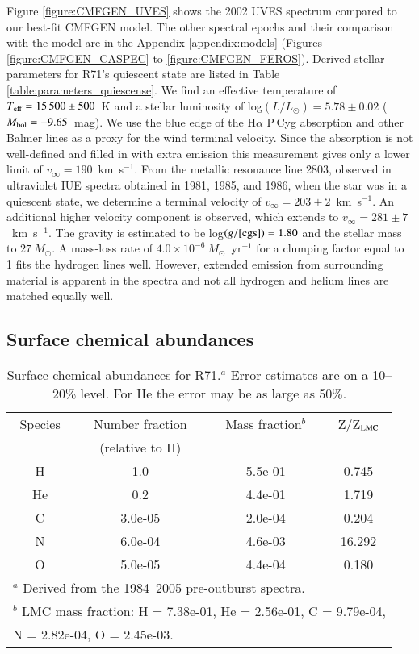 \documentclass[structabstract]{aa}
\begin{document}
Figure \ref{figure:CMFGEN_UVES} shows the 2002 UVES spectrum compared to our best-fit CMFGEN model. The other spectral epochs and their comparison with the model are in the Appendix \ref{appendix:models} (Figures \ref{figure:CMFGEN_CASPEC} to \ref{figure:CMFGEN_FEROS}).  Derived stellar parameters for R71's quiescent state are listed in Table \ref{table:parameters_quiescense}.
We find an effective temperature of $T_\textnormal{\scriptsize{eff}} = 15\,500 \pm 500$~K and a stellar luminosity of log$(L/L_{\odot}) = 5.78 \pm 0.02$ ($M_\textnormal{\scriptsize{bol}}  = -9.65$~mag).
We use the blue edge of the H$\alpha$ P\,Cyg absorption and other Balmer lines as a proxy for the wind terminal velocity. Since the absorption is not well-defined and filled in with extra emission this measurement gives only a lower limit of $v_\infty = 190$~km~s$^{-1}$. 
From the metallic resonance line  2803, observed in ultraviolet IUE spectra obtained in 1981, 1985, and 1986, when the star was in a quiescent state, we determine a terminal velocity of $v_\infty = 203 \pm2$~km~s$^{-1}$. An additional higher velocity component is observed, which extends to $v_\infty = 281 \pm7$~km~s$^{-1}$.
The gravity is estimated to be log$(g/\textnormal{[cgs]}) = 1.80$ and the stellar mass to $27~M_{\odot}$. A mass-loss rate of $4.0 \times 10^{-6}~M_{\odot}$~yr$^{-1}$ for a clumping factor equal to 1 fits the hydrogen lines well. However, extended emission from surrounding material is apparent in the spectra and not all hydrogen and helium lines are matched equally well. 


\subsection{Surface chemical abundances}
\label{results:abundances}

\begin{table}
\caption{Surface chemical abundances for R71.$^a$  Error estimates are on a 10--20\% level. For He the error may be as large as 50\%. \label{table:abundances}}
\begin{tabular}{cccc}
\hline\hline 
Species & Number fraction & Mass fraction$^b$ &  Z/Z$_{\textnormal{\scriptsize{LMC}}}$  \\ %
& (relative to H) & &   \\ %
\hline
H & 1.0 & 5.5e-01 &  0.745   \\
He & 0.2 & 4.4e-01 &  1.719   \\
C & 3.0e-05 & 2.0e-04 &  0.204   \\
N & 6.0e-04 & 4.6e-03 &  16.292   \\
O & 5.0e-05 & 4.4e-04 &  0.180  \\
\hline
\multicolumn{4}{l}{$^a$ Derived from the 1984--2005 pre-outburst spectra.} \\
\multicolumn{4}{l}{$^b$ LMC mass fraction: H = 7.38e-01, He = 2.56e-01, C =  9.79e-04,} \\
\multicolumn{4}{l}{\phantom{$^b$} N = 2.82e-04, O = 2.45e-03.} \\\end{tabular}
\end{table}
\end{document}
